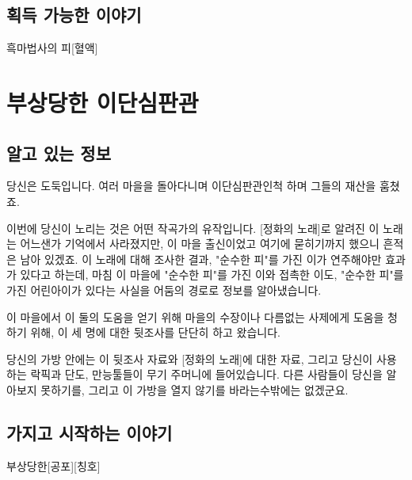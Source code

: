 \documentclass{report}
\begin{document}
		\subsection*{획득 가능한 이야기}
			\begin{spoiler}{흑마법사의 피}{[혈액]}
			\end{spoiler}
	
	
	
	
	\pagebreak \hypertarget{hurt-rogue}{}
	\section{부상당한 이단심판관}
		\subsection*{알고 있는 정보}
			당신은 도둑입니다. 여러 마을을 돌아다니며 이단심판관인척 하며 그들의 재산을 훔쳤죠.
			
			이번에 당신이 노리는 것은 어떤 작곡가의 유작입니다. [정화의 노래]로 알려진 이 노래는 어느샌가 기억에서 사라졌지만, 이 마을 출신이었고 여기에 묻히기까지 했으니 흔적은 남아 있겠죠. 이 노래에 대해 조사한 결과, "순수한 피"를 가진 이가 연주해야만 효과가 있다고 하는데, 마침 이 마을에 "순수한 피"를 가진 이와 접촉한 이도, "순수한 피"를 가진 어린아이가 있다는 사실을 어둠의 경로로 정보를 알아냈습니다.
			
			이 마을에서 이 둘의 도움을 얻기 위해 마을의 수장이나 다름없는 사제에게 도움을 청하기 위해, 이 세 명에 대한 뒷조사를 단단히 하고 왔습니다.
			
			당신의 가방 안에는 이 뒷조사 자료와 [정화의 노래]에 대한 자료, 그리고 당신이 사용하는 락픽과 단도, 만능툴들이 무기 주머니에 들어있습니다. 다른 사람들이 당신을 알아보지 못하기를, 그리고 이 가방을 열지 않기를 바라는수밖에는 없겠군요.
			
		\subsection*{가지고 시작하는 이야기}
			\begin{spoiler}{부상당한}{[공포][칭호]}
				
			\end{spoiler}
			
\end{document}

